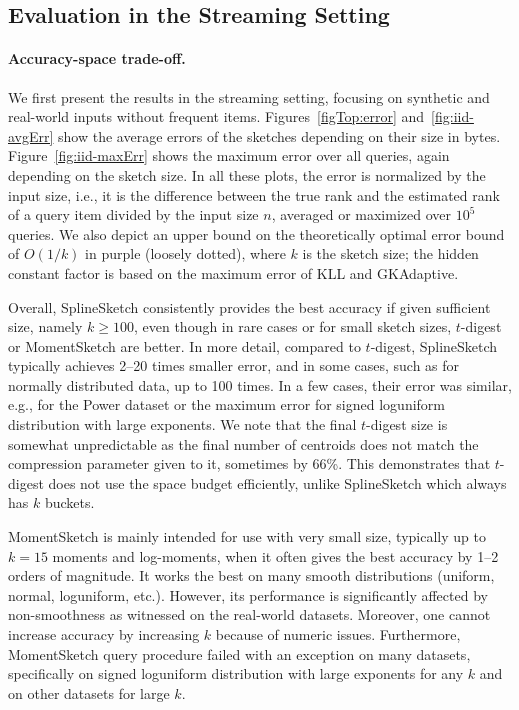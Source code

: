 \documentclass[acmsmall]{acmart}
\theoremstyle{remark}
\begin{document}
\clearpage

\subsection{Evaluation in the Streaming Setting}

\paragraph{Accuracy-space trade-off.}
We first present the results in the streaming setting, focusing on synthetic and real-world inputs without frequent items.
Figures~\ref{figTop:error} and~\ref{fig:iid-avgErr} show the average errors of the sketches depending on their size in bytes.
Figure~\ref{fig:iid-maxErr} shows the maximum error over all queries, again depending on the sketch size.
In all these plots, the error is normalized by the input size, i.e., it is the difference 
between the true rank and the estimated rank of a query item divided by the input size $n$, averaged or maximized over $10^5$ queries.
We also depict an upper bound on the theoretically optimal error bound of $O(1/k)$ in purple (loosely dotted), where $k$ is the sketch size; the hidden constant factor is based on the maximum error of KLL and GKAdaptive.

Overall, SplineSketch consistently provides the best accuracy if given sufficient size, namely $k\ge 100$,
even though in rare cases or for small sketch sizes, $t$-digest or MomentSketch are better.
In more detail,
compared to $t$-digest, SplineSketch typically achieves 2--20 times smaller error,
and in some cases, such as for normally distributed data, up to 100 times.
In a few cases, their error was similar, e.g., for the Power dataset or the maximum error for signed loguniform distribution with large exponents.
We note that the final $t$-digest size is somewhat unpredictable as
the final number of centroids does not match the compression parameter given to it, sometimes
by 66\%.
This demonstrates that $t$-digest does not use the space budget efficiently, unlike SplineSketch
which always has $k$ buckets.



MomentSketch is mainly intended for use with very small size, typically up to $k=15$ moments and log-moments,
when it often gives the best accuracy by 1--2 orders of magnitude.
It works the best on many smooth distributions (uniform, normal, loguniform, etc.).
However, its performance is significantly affected by non-smoothness as witnessed on the real-world datasets. Moreover, one cannot increase accuracy by increasing $k$ because of numeric issues.
Furthermore, MomentSketch query procedure failed with an exception on many datasets,
specifically on signed loguniform distribution with large exponents for any $k$ and 
on other datasets for large $k$.
\end{document}
